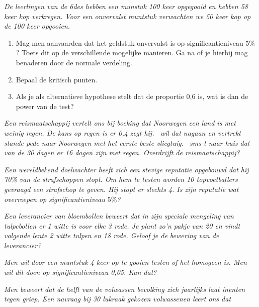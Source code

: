 {{\footnotesize
\begin{Opgave}\label{thyp1}\em 
De leerlingen van de 6des  hebben een munstuk 100 keer opgegooid en hebben 
58 
keer kop 
verkregen.  Voor een onvervalst muntstuk verwachten we 50 keer kop op de 100 keer opgooien.
\begin{enumerate}
 \item Mag men aanvaarden dat het geldstuk onvervalst is op significantieniveau $5\%$? Toets dit op de verschillende mogelijke manieren. Ga na of je hierbij mag benaderen door de normale verdeling.
\item Bepaal de kritisch punten.  
\item Als je als alternatieve hypothese stelt dat de proportie 0,6 is, wat is dan de power van de test?
\end{enumerate}
 \end{Opgave}
 \begin{opgave}\label{thyp2} \em Een reismaatschappij vertelt ons bij boeking dat Noorwegen een land
is met weinig regen. De kans op regen is er 0,4 zegt hij. \leerlw\ wil dat  nagaan en vertrekt stande pede naar Noorwegen met het eerste beste vliegtuig. \leerlw\ sms-t naar huis dat  
van de 30 dagen  er 16 dagen zijn met regen. Overdrijft de reismaatschappij?
\end{opgave}
\begin{opgave}
\label{hypo1}
 \em Een wereldbekend doelwachter heeft zich een stevige 
reputatie opgebouwd dat hij 70\% van de strafschoppen stopt. Om hem te testen 
worden 10 topvoetballers gevraagd een strafschop te geven. Hij stopt er slechts
4. Is zijn reputatie wat overroepen op significantieniveau $5\%$?
\end{opgave}
\begin{opgave}
\label{hypo2}
\em Een leverancier van bloembollen beweert dat in zijn speciale mengeling van 
tulpebollen er 1 witte is voor elke 3 rode. Je plant zo'n pakje van 20 en vindt
volgende lente 2 witte tulpen en 18 rode. Geloof je de bewering van de 
leverancier?
\end{opgave}
\begin{opgave}
\label{hypo3}
\em Men wil door een muntstuk 4 keer op te gooien testen of het homogeen is. 
Men 
wil dit doen op significantieniveau 0,05. Kan dat?
\end{opgave}
\begin{opgave}
\label{hypo4}
\em Men beweert dat de helft van de volwassen bevolking zich jaarlijks laat 
inenten
tegen griep. Een navraag bij 30 lukraak gekozen volwassenen leert ons dat 

\end{opgave}}}
